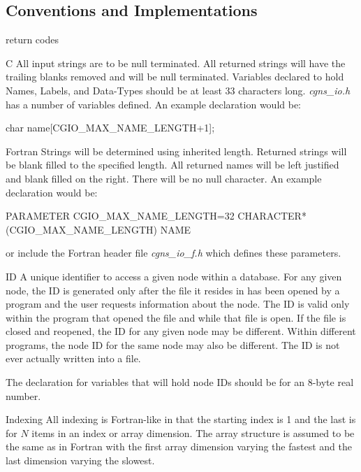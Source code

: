 \subsection{Conventions and Implementations}
\label{s:conventions}

\begin{Ventryi}{return codes}
\item [C]
      All input strings are to be null terminated.
      All returned strings will have the trailing blanks removed and
      will be null terminated.
      Variables declared to hold Names, Labels, and Data-Types should
      be at least 33 characters long.
      \textit{cgns\_io.h} has a number of variables defined.
      An example declaration would be:
\begin{indlefttt}
char name[CGIO\_MAX\_NAME\_LENGTH+1];
\end{indlefttt}
\item [Fortran]
      Strings will be determined using inherited length.
      Returned strings will be blank filled to the specified length.
      All returned names will be left justified and blank filled on the
      right.
      There will be no null character.
      An example declaration would be:
\begin{indlefttt}
PARAMETER CGIO\_MAX\_NAME\_LENGTH=32
CHARACTER*(CGIO\_MAX\_NAME\_LENGTH) NAME
\end{indlefttt}
      or include the Fortran header file \textit{cgns\_io\_f.h}
      which defines these parameters.
\item [ID]
      A unique identifier to access a given node within a database.
      For any given node, the ID is generated only after the file it
      resides in has been opened by a program and the user requests
      information about the node.
      The ID is valid only within the program that opened the file and
      while that file is open.
      If the file is closed and reopened, the ID for any given node
      may be different.
      Within different programs, the node ID for the same node may
      also be different.
      The ID is not ever actually written into a file.

      The declaration for variables that will hold node IDs should be
      for an 8-byte real number.
\item [Indexing]
      All indexing is Fortran-like in that the starting index is 1 and
      the last is  for $N$ items in an index or array
      dimension.
      The array structure is assumed to be the same as in Fortran
      with the first array dimension varying the fastest and the last
      dimension varying the slowest.
 

\end{Ventryi}
